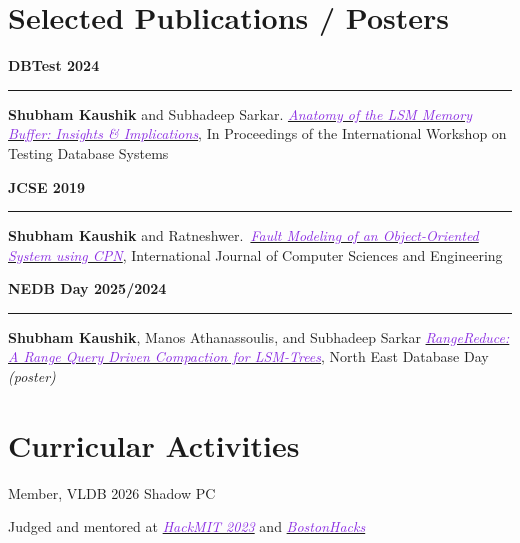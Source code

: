 \documentclass[11pt,a4paper,calibri]{moderncv}
\newcommand{\publication}[2]{
\noindent
  \begin{minipage}[c]{0.12\textwidth} \centering \textbf{#1} \end{minipage}%
  \hspace{0.005\textwidth}
  \begin{minipage}[c]{0.02\textwidth} \textcolor{lightgray}{\rule{1pt}{0.75cm}} \end{minipage}%
  \begin{minipage}[c]{0.85\textwidth} \raggedright{#2} \end{minipage}%
}
\begin{document}
% 

\vspace{-0.7em}
\section{Selected Publications / Posters}
\publication{DBTest 2024}{\textbf{Shubham Kaushik} and Subhadeep Sarkar. \href{https://doi.org/10.1145/3662165.3662766}{\textit{\textcolor{blueviolet}{Anatomy
        of the LSM Memory Buffer: Insights \& Implications}}}, In Proceedings of the International Workshop on Testing Database Systems}

\mediumspace{}

\publication{JCSE 2019}{\textbf{Shubham Kaushik} and Ratneshwer.\ \href{https://doi.org/10.26438/ijcse/v7i5.18281845}{\textit{\textcolor{blueviolet}{Fault
        Modeling of an Object-Oriented System using CPN}}}, International Journal of Computer Sciences and Engineering}

\mediumspace{}

\publication{NEDB Day 2025/2024}{\textbf{Shubham Kaushik}, Manos Athanassoulis, and Subhadeep Sarkar
  \href{https://bu-disc.github.io/nedbday/2024/download/posters/RangeReduce_A_Range_Query_Driven_Compaction_for_LSM-Trees.pdf}
  {\textit{\textcolor{blueviolet}{RangeReduce: A Range Query Driven Compaction for LSM-Trees}}}, North East Database Day \hfill \textit{(poster)}}


\vspace{-0.5em}
\section{Curricular Activities}
\begin{itemize*}[itemjoin=\hspace{8em}]
  \item Member, VLDB 2026 Shadow PC
  \item Judged and mentored at \href{https://hackmit.org/}{\textcolor{blueviolet}{\textit{HackMIT 2023}}} and \href{https://bostonhacks.io/}
	{\textit{\textcolor{blueviolet}{BostonHacks}}}
\end{itemize*}


\mediumspace{}






\end{document}
